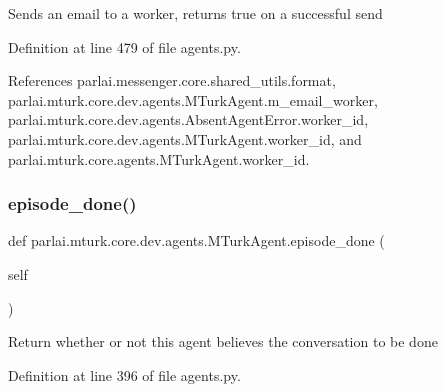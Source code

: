 \begin{DoxyVerb}Sends an email to a worker, returns true on a successful send\end{DoxyVerb}
 

Definition at line 479 of file agents.\+py.



References parlai.\+messenger.\+core.\+shared\+\_\+utils.\+format, parlai.\+mturk.\+core.\+dev.\+agents.\+M\+Turk\+Agent.\+m\+\_\+email\+\_\+worker, parlai.\+mturk.\+core.\+dev.\+agents.\+Absent\+Agent\+Error.\+worker\+\_\+id, parlai.\+mturk.\+core.\+dev.\+agents.\+M\+Turk\+Agent.\+worker\+\_\+id, and parlai.\+mturk.\+core.\+agents.\+M\+Turk\+Agent.\+worker\+\_\+id.

\mbox{\label{classparlai_1_1mturk_1_1core_1_1dev_1_1agents_1_1MTurkAgent_afd7f0e409db68b1f61b3a82f3c05cee1}} 
\subsubsection{\texorpdfstring{episode\+\_\+done()}{episode\_done()}}
{\footnotesize\ttfamily def parlai.\+mturk.\+core.\+dev.\+agents.\+M\+Turk\+Agent.\+episode\+\_\+done (\begin{DoxyParamCaption}\item[{}]{self }\end{DoxyParamCaption})}

\begin{DoxyVerb}Return whether or not this agent believes the conversation to
be done\end{DoxyVerb}
 

Definition at line 396 of file agents.\+py.



